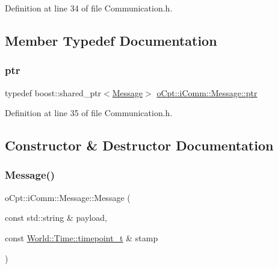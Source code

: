 Definition at line 34 of file Communication.\+h.



\subsection{Member Typedef Documentation}
\hypertarget{structo_cpt_1_1i_comm_1_1_message_ad2ba828ad76f96a30e3898b2609a4c01}{}\label{structo_cpt_1_1i_comm_1_1_message_ad2ba828ad76f96a30e3898b2609a4c01} 
\subsubsection{\texorpdfstring{ptr}{ptr}}
{\footnotesize\ttfamily typedef boost\+::shared\+\_\+ptr$<$\hyperlink{structo_cpt_1_1i_comm_1_1_message}{Message}$>$ \hyperlink{structo_cpt_1_1i_comm_1_1_message_ad2ba828ad76f96a30e3898b2609a4c01}{o\+Cpt\+::i\+Comm\+::\+Message\+::ptr}}



Definition at line 35 of file Communication.\+h.



\subsection{Constructor \& Destructor Documentation}
\hypertarget{structo_cpt_1_1i_comm_1_1_message_acabc9841f33a226d3670e524ef8f69c5}{}\label{structo_cpt_1_1i_comm_1_1_message_acabc9841f33a226d3670e524ef8f69c5} 
\subsubsection{\texorpdfstring{Message()}{Message()}}
{\footnotesize\ttfamily o\+Cpt\+::i\+Comm\+::\+Message\+::\+Message (\begin{DoxyParamCaption}\item[{const std\+::string \&}]{payload,  }\item[{const \hyperlink{classo_cpt_1_1_world_1_1_time_a6a6e782c3c90622c1c7070b0a223ec4c}{World\+::\+Time\+::timepoint\+\_\+t} \&}]{stamp }\end{DoxyParamCaption})\hspace{0.3cm}{\ttfamily [inline]}}

